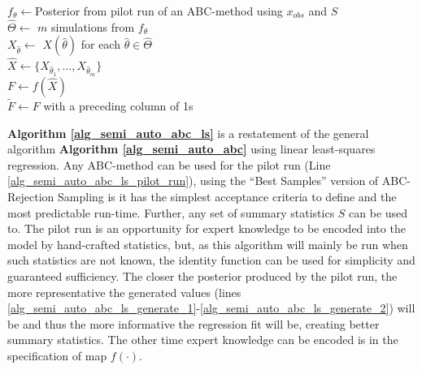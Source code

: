 \documentclass[11pt,a4paper]{article}
\theoremstyle{break}
\begin{document}
  \begin{box_algorithm}\label{alg_semi_auto_abc_ls}
    \begin{algorithm}[H]
      $f_\theta\leftarrow$Posterior from pilot run of an ABC-method using $x_{obs}$ and $S$\label{alg_semi_auto_abc_ls_pilot_run}\\
      $\hat\Theta\leftarrow$ $m$ simulations from $f_\theta$\label{alg_semi_auto_abc_ls_generate_1}\\
      $X_{\hat\theta}\leftarrow$ $X\left(\hat\theta\right)$ for each $\hat\theta\in\hat\Theta$\label{alg_semi_auto_abc_ls_generate_2}\\
      $\hat{X}\leftarrow\{X_{\hat\theta_1},\dots,X_{\hat\theta_m}\}$\\
      $F\leftarrow f(\hat{X})$\\
      $\tilde{F}\leftarrow F$ with a preceding column of 1s\\
    \end{algorithm}
  \end{box_algorithm}

  \par \textbf{Algorithm \ref{alg_semi_auto_abc_ls}} is a restatement of the general algorithm \textbf{Algorithm \ref{alg_semi_auto_abc}} using linear least-squares regression. Any ABC-method can be used for the pilot run (Line \ref{alg_semi_auto_abc_ls_pilot_run}), using the ``Best Samples'' version of ABC-Rejection Sampling is it has the simplest acceptance criteria to define and the most predictable run-time. Further, any set of summary statistics $S$ can be used to. The pilot run is an opportunity for expert knowledge to be encoded into the model by hand-crafted statistics, but, as this algorithm will mainly be run when such statistics are not known, the identity function can be used for simplicity and guaranteed sufficiency. The closer the posterior produced by the pilot run, the more representative the generated values (lines \ref{alg_semi_auto_abc_ls_generate_1}-\ref{alg_semi_auto_abc_ls_generate_2}) will be and thus the more informative the regression fit will be, creating better summary statistics. The other time expert knowledge can be encoded is in the specification of map $f(\cdot)$.
\end{document}
